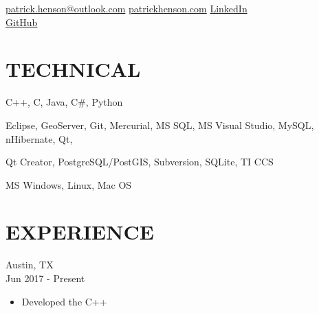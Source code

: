 \documentclass{article}
\begin{document}
\renewcommand\familydefault{\sfdefault}



\hfill

\noindent\hrulefill

\noindent 
\href{mailto:fullname@email.com}{patrick.henson@outlook.com}
\hfill
\href{https://patrickhenson.com}{patrickhenson.com}
\hfill
\href{linkedin.com/in/patrickhenson}{LinkedIn}
\\
\hfill
\href{https://github.com/PatrickHenson}{GitHub}

\section*{TECHNICAL}

 \hspace{5.0em}
C++, C, Java, C\#, Python

 \hspace{1.0em}
Eclipse, GeoServer, Git, Mercurial, MS SQL, MS Visual Studio, MySQL, nHibernate, Qt,

\hspace{9.0em} Qt Creator, PostgreSQL/PostGIS, Subversion, SQLite, TI CCS

 \hspace{0.5em}
MS Windows, Linux, Mac OS

\section*{EXPERIENCE}

 \hfill Austin, TX \\
 \hfill Jun 2017 - Present
\begin{itemize}
\item Developed the C++
\end{itemize}
\end{document}
